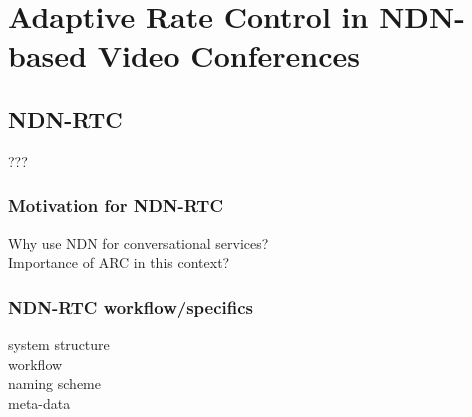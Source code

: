 \chapter{Adaptive Rate Control in NDN-based Video Conferences} \label{chapter:Topic}


\section{NDN-RTC}
???

\subsection{Motivation for NDN-RTC}
Why use NDN for conversational services? \\
Importance of ARC in this context?

\subsection{NDN-RTC workflow/specifics}
system structure \\
workflow \\
naming scheme \\
meta-data \\

